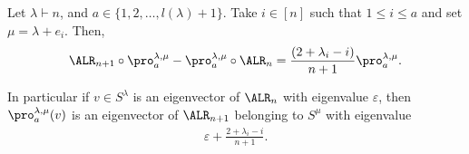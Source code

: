 \documentclass[11pt]{report}
\begin{document}
\begin{thm}
	\label{chpt5:thm:lift}
	
	
	Let $\lambda \vdash n$, and  $a \in \{1,2,\ldots,l(\lambda)+1\}$. Take $i\in [n]$ such that  $1 \leq i \leq a$ and set $\mu = \lambda +e_{i}$. Then,
	\begin{eqnarray}
	\ALR_{n+1} \circ \pro_{a}^{\lambda,\mu} - 
	\pro_{a}^{\lambda,\mu} \circ \ALR_{n} = \frac{(2 + 
		\lambda_{i} -i)}{n+1}\pro_{a}^{\lambda,\mu} .
	\end{eqnarray}
	
	In particular if $v \in S^{\lambda}$ is an eigenvector of $\ALR_{n}$ 
	with 
	eigenvalue $\varepsilon$, then  
	$\pro_{a}^{\lambda,\mu}(v)$ is an eigenvector of 
	$\ALR_{n+1}$ belonging to $S^{\mu}$ with eigenvalue 
	\begin{eqnarray}
	\varepsilon + \frac{2 +\lambda_{i} -i }{n+1}.
	\end{eqnarray}
	
\end{thm}
\end{document}
